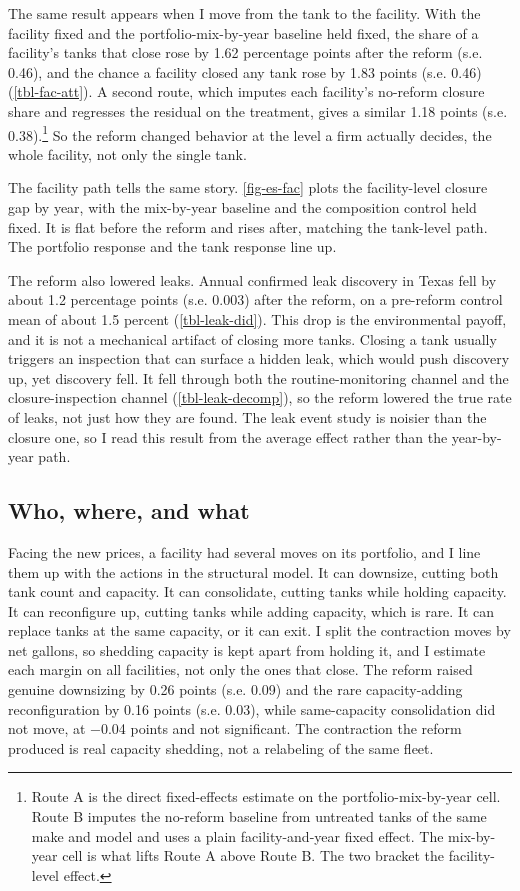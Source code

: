 \documentclass[
  12pt,
]{article}
\begin{document}
The same result appears when I move from the tank to the facility. With
the facility fixed and the portfolio-mix-by-year baseline held fixed,
the share of a facility's tanks that close rose by 1.62 percentage
points after the reform (s.e. 0.46), and the chance a facility closed
any tank rose by 1.83 points (s.e. 0.46) (\autoref{tbl-fac-att}). A
second route, which imputes each facility's no-reform closure share and
regresses the residual on the treatment, gives a similar 1.18 points
(s.e. 0.38).\footnote{Route A is the direct fixed-effects estimate on
  the portfolio-mix-by-year cell. Route B imputes the no-reform baseline
  from untreated tanks of the same make and model and uses a plain
  facility-and-year fixed effect. The mix-by-year cell is what lifts
  Route A above Route B. The two bracket the facility-level effect.} So
the reform changed behavior at the level a firm actually decides, the
whole facility, not only the single tank.

The facility path tells the same story. \autoref{fig-es-fac} plots the
facility-level closure gap by year, with the mix-by-year baseline and
the composition control held fixed. It is flat before the reform and
rises after, matching the tank-level path. The portfolio response and
the tank response line up.

The reform also lowered leaks. Annual confirmed leak discovery in Texas
fell by about 1.2 percentage points (s.e. 0.003) after the reform, on a
pre-reform control mean of about 1.5 percent (\autoref{tbl-leak-did}).
This drop is the environmental payoff, and it is not a mechanical
artifact of closing more tanks. Closing a tank usually triggers an
inspection that can surface a hidden leak, which would push discovery
up, yet discovery fell. It fell through both the routine-monitoring
channel and the closure-inspection channel (\autoref{tbl-leak-decomp}),
so the reform lowered the true rate of leaks, not just how they are
found. The leak event study is noisier than the closure one, so I read
this result from the average effect rather than the year-by-year path.

\subsection{Who, where, and what}\label{who-where-and-what}

Facing the new prices, a facility had several moves on its portfolio,
and I line them up with the actions in the structural model. It can
downsize, cutting both tank count and capacity. It can consolidate,
cutting tanks while holding capacity. It can reconfigure up, cutting
tanks while adding capacity, which is rare. It can replace tanks at the
same capacity, or it can exit. I split the contraction moves by net
gallons, so shedding capacity is kept apart from holding it, and I
estimate each margin on all facilities, not only the ones that close.
The reform raised genuine downsizing by 0.26 points (s.e. 0.09) and the
rare capacity-adding reconfiguration by 0.16 points (s.e. 0.03), while
same-capacity consolidation did not move, at −0.04 points and not
significant. The contraction the reform produced is real capacity
shedding, not a relabeling of the same fleet.
\end{document}

